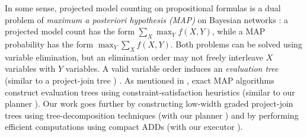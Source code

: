 In some sense, projected model counting on propositional formulas is a dual problem of \emph{maximum a posteriori hypothesis (MAP)} \cite{murphy2012machine,maua2015complexity,xue2016solving} on Bayesian networks \cite{pearl1985bayesian}: a projected model count has the form $\sum_X \max_Y f(X, Y)$, while a MAP probability has the form $\max_Y \sum_X f(X, Y)$.
Both problems can be solved using variable elimination, but an elimination order may not freely interleave $X$ variables with $Y$ variables.
A valid variable order induces an \emph{evaluation tree} (similar to a project-join tree%
) \cite{park2004complexity}.
As mentioned in \cite{park2004complexity}, exact MAP algorithms construct evaluation trees using constraint-satisfaction heuristics (similar to our planner \htb).
Our work goes further by constructing low-width graded project-join trees using tree-decomposition techniques (with our planner \Lg) and by performing efficient computations using compact ADDs (with our executor \Dmc).
